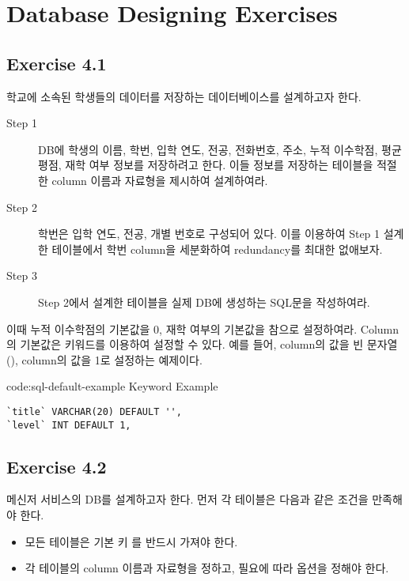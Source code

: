 \section{Database Designing Exercises}\label{sect:database-designing-exercises}

\subsection*{Exercise 4.1}

학교에 소속된 학생들의 데이터를 저장하는 데이터베이스를 설계하고자 한다.

\begin{description}
    \item[Step 1] DB에 학생의 이름, 학번, 입학 연도, 전공, 전화번호, 주소, 누적 이수학점, 평균 평점, 재학 여부 정보를 저장하려고 한다. 이들 정보를 저장하는 테이블을 적절한 column 이름과 자료형을 제시하여 설계하여라.
    \item[Step 2] 학번은 입학 연도, 전공, 개별 번호로 구성되어 있다. 이를 이용하여 Step 1 설계한 테이블에서 학번 column을 세분화하여 redundancy를 최대한 없애보자.
    \item[Step 3] Step 2에서 설계한 테이블을 실제 DB에 생성하는 SQL문을 작성하여라.
\end{description}

이때 누적 이수학점의 기본값을 0, 재학 여부의 기본값을 참으로 설정하여라. Column의 기본값은  키워드를 이용하여 설정할 수 있다. 예를 들어, \은  column의 값을 빈 문자열(),  column의 값을 1로 설정하는 예제이다.

\begin{codeenv}{code:sql-default-example}{ Keyword Example}\begin{verbatim}
`title` VARCHAR(20) DEFAULT '',
`level` INT DEFAULT 1,
\end{verbatim}
\end{codeenv}

\subsection*{Exercise 4.2}

메신저 서비스의 DB를 설계하고자 한다. 먼저 각 테이블은 다음과 같은 조건을 만족해야 한다.

\begin{itemize}
    \item 모든 테이블은 기본 키 를 반드시 가져야 한다.
    \item 각 테이블의 column 이름과 자료형을 정하고, 필요에 따라 옵션을 정해야 한다.
\end{itemize}

